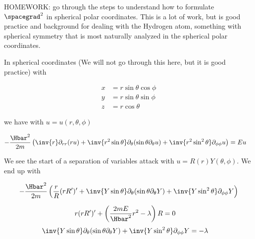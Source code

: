 %
%
HOMEWORK: go through the steps to understand how to formulate \(\spacegrad^2\) in spherical polar coordinates.  This is a lot of work, but is good practice and background for dealing with the Hydrogen atom, something with spherical symmetry that is most naturally analyzed in the spherical polar coordinates.

In spherical coordinates (We will not go through this here, but it is good practice) with

\begin{equation}\label{eqn:lecture5BigReviewAngularMomentum:5020}
\begin{aligned}
x &= r \sin\theta \cos\phi \\
y &= r \sin\theta \sin\phi \\
z &= r \cos\theta
\end{aligned}
\end{equation}

we have with \(u = u(r,\theta, \phi)\)

\begin{equation}\label{eqn:lecture5BigReviewAngularMomentum:5040}
\begin{aligned}
-\frac{\Hbar^2}{2m} \left(
\inv{r} \partial_{rr} (r u) +  \inv{r^2 \sin\theta} \partial_\theta (\sin\theta \partial_\theta u)
+ \inv{r^2 \sin^2\theta} \partial_{\phi\phi} u
 \right)
&= E u
\end{aligned}
\end{equation}

We see the start of a separation of variables attack with \(u = R(r) Y(\theta, \phi)\).  We end up with

\begin{equation}\label{eqn:lecture5BigReviewAngularMomentum:5060}
\begin{aligned}
-\frac{\Hbar^2}{2m} &\left(
\frac{r}{R} (r R')' +  \inv{Y \sin\theta} \partial_\theta (\sin\theta \partial_\theta Y)
+ \inv{Y \sin^2\theta} \partial_{\phi\phi} Y
 \right) \\
\end{aligned}
\end{equation}

\begin{equation}\label{eqn:lecture5BigReviewAngularMomentum:5080}
\begin{aligned}
r (r R')' + \left( \frac{2m E}{\Hbar^2} r^2 - \lambda \right) R &= 0
\end{aligned}
\end{equation}
\begin{equation}\label{eqn:lecture5BigReviewAngularMomentum:5100}
\begin{aligned}
\inv{Y \sin\theta} \partial_\theta (\sin\theta \partial_\theta Y) + \inv{Y \sin^2\theta} \partial_{\phi\phi} Y &= -\lambda
\end{aligned}
\end{equation}

